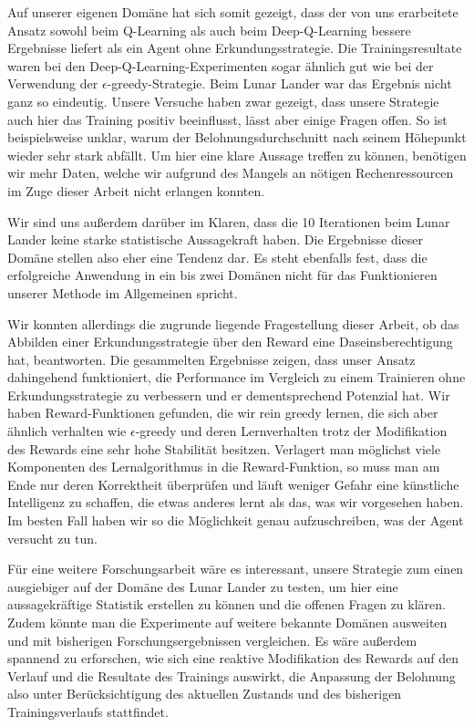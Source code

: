 Auf unserer eigenen Domäne hat sich somit gezeigt, dass der von uns erarbeitete Ansatz sowohl beim Q-Learning als auch beim Deep-Q-Learning bessere Ergebnisse liefert als ein Agent ohne Erkundungsstrategie. Die Trainingsresultate waren bei den Deep-Q-Learning-Experimenten sogar ähnlich gut wie bei der Verwendung der $ \epsilon $-greedy-Strategie. Beim Lunar Lander war das Ergebnis nicht ganz so eindeutig. Unsere Versuche haben zwar gezeigt, dass unsere Strategie auch hier das Training positiv beeinflusst, lässt aber einige Fragen offen. So ist beispielsweise unklar, warum der Belohnungsdurchschnitt nach seinem Höhepunkt wieder sehr stark abfällt. Um hier eine klare Aussage treffen zu können, benötigen wir mehr Daten, welche wir aufgrund des Mangels an nötigen Rechenressourcen im Zuge dieser Arbeit nicht erlangen konnten. 

Wir sind uns außerdem darüber im Klaren, dass die 10 Iterationen beim Lunar Lander keine starke statistische Aussagekraft haben. Die Ergebnisse dieser Domäne stellen also eher eine Tendenz dar. Es steht ebenfalls fest, dass die erfolgreiche Anwendung in ein bis zwei Domänen nicht für das Funktionieren unserer Methode im Allgemeinen spricht.

Wir konnten allerdings die zugrunde liegende Fragestellung dieser Arbeit, ob das Abbilden einer Erkundungsstrategie über den Reward eine Daseinsberechtigung hat, beantworten. Die gesammelten Ergebnisse zeigen, dass unser Ansatz dahingehend funktioniert, die Performance im Vergleich zu einem Trainieren ohne Erkundungsstrategie zu verbessern und er dementsprechend Potenzial hat. Wir haben Reward-Funktionen gefunden, die wir rein greedy lernen, die sich aber ähnlich verhalten wie $ \epsilon $-greedy und deren Lernverhalten trotz der Modifikation des Rewards eine sehr hohe Stabilität besitzen. Verlagert man möglichst viele Komponenten des Lernalgorithmus in die Reward-Funktion, so muss man am Ende nur deren Korrektheit überprüfen und läuft weniger Gefahr eine künstliche Intelligenz zu schaffen, die etwas anderes lernt als das, was wir vorgesehen haben. Im besten Fall haben wir so die Möglichkeit genau aufzuschreiben, was der Agent versucht zu tun.

Für eine weitere Forschungsarbeit wäre es interessant, unsere Strategie zum einen ausgiebiger auf der Domäne des Lunar Lander zu testen, um hier eine aussagekräftige Statistik erstellen zu können und die offenen Fragen zu klären. Zudem könnte man die Experimente auf weitere bekannte Domänen ausweiten und mit bisherigen Forschungsergebnissen vergleichen. Es wäre außerdem spannend zu erforschen, wie sich eine reaktive Modifikation des Rewards auf den Verlauf und die Resultate des Trainings auswirkt, die Anpassung der Belohnung also unter Berücksichtigung des aktuellen Zustands und des bisherigen Trainingsverlaufs stattfindet.